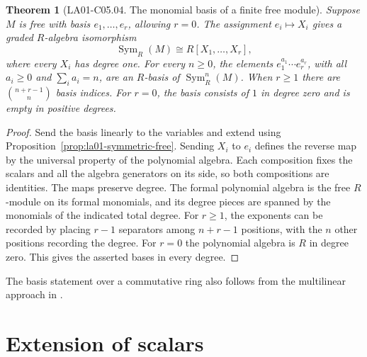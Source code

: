 \documentclass[11pt,oneside,openany]{book}
\newtheorem{theorem}{Theorem}[chapter]
\theoremstyle{definition}
\theoremstyle{remark}
\begin{document}
\begin{theorem}[LA01-C05.04. The monomial basis of a finite free module]
\label{thm:la01-symmetric-basis}
Suppose \(M\) is free with basis \(e_1,\ldots,e_r\), allowing \(r=0\).
The assignment \(e_i\mapsto X_i\) gives a graded \(R\)-algebra
isomorphism
\[
  \operatorname{Sym}_R(M)\cong R[X_1,\ldots,X_r],
\]
where every \(X_i\) has degree one. For every \(n\ge 0\), the
elements \(e_1^{a_1}\cdots e_r^{a_r}\), with all \(a_i\ge 0\) and
\(\sum_i a_i=n\), are an \(R\)-basis of \(\operatorname{Sym}^n_R(M)\).
When \(r\ge 1\) there are \(\binom{n+r-1}{n}\) basis indices. For
\(r=0\), the basis consists of \(1\) in degree zero and is empty
in positive degrees.
\end{theorem}
\begin{proof}
Send the basis linearly to the variables and extend using
Proposition~\ref{prop:la01-symmetric-free}. Sending \(X_i\) to \(e_i\)
defines the reverse map by the universal property of the polynomial
algebra. Each composition fixes the scalars and all the algebra
generators on its side, so both compositions are identities.
The maps preserve degree. The formal polynomial algebra is the free
\(R\)-module on its formal monomials, and its degree pieces are
spanned by the monomials of the indicated total degree. For \(r\ge 1\),
the exponents can be recorded by placing \(r-1\) separators among
\(n+r-1\) positions, with the \(n\) other positions recording the
degree. For \(r=0\) the polynomial algebra is \(R\) in degree zero.
This gives the asserted bases in every degree.
\end{proof}

The basis statement over a commutative ring also follows from the
multilinear approach in \cite[Theorem 1.2]{conrad-sym}.

\section{Extension of scalars}
\end{document}
